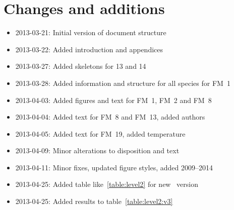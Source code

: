 \chapter{Changes and additions}
\label{ch:changes}

\begin{itemize}
    \item 2013-03-21: Initial version of document structure
    \item 2013-03-22: Added introduction and appendices
    \item 2013-03-27: Added skeletons for 13 and 14
    \item 2013-03-28: Added information and structure for all species for FM~1
    \item 2013-04-03: Added figures and text for FM~1, FM~2 and FM~8
    \item 2013-04-04: Added text for FM~8 and FM~13, added authors
    \item 2013-04-05: Added text for FM~19, added temperature
    \item 2013-04-09: Minor alterations to disposition and text
    \item 2013-04-11: Minor fixes, updated figure styles, added 2009--2014
    \item 2013-04-25: Added table like~\ref{table:level2} for new \smr~version
    \item 2013-04-25: Added results to table~\ref{table:level2:v3}
\end{itemize}
